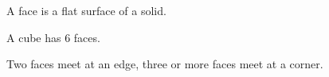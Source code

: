 A face is a flat surface of a solid.
\par
A cube has 6 faces.
\par
Two faces meet at an edge, three or more faces meet at a corner.